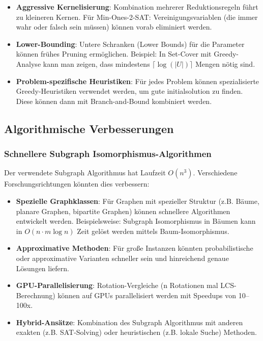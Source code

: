 ﻿\documentclass[a4paper,12pt]{article}
\theoremstyle{definition}
\begin{document}
\begin{itemize}
	\item \textbf{Aggressive Kernelisierung}: Kombination mehrerer Reduktionsregeln führt zu kleineren Kernen. Für Min-Ones-2-SAT: Vereinigungsvariablen (die immer wahr oder falsch sein müssen) können vorab eliminiert werden.
	
	\item \textbf{Lower-Bounding}: Untere Schranken (Lower Bounds) für die Parameter können frühes Pruning ermöglichen. Beispiel: In Set-Cover mit Greedy-Analyse kann man zeigen, dass mindestens $\lceil \log(|U|) \rceil$ Mengen nötig sind.
	
	\item \textbf{Problem-spezifische Heuristiken}: Für jedes Problem können spezialisierte Greedy-Heuristiken verwendet werden, um gute initialsolution zu finden. Diese können dann mit Branch-and-Bound kombiniert werden.
\end{itemize}

\subsection{Algorithmische Verbesserungen}

\subsubsection{Schnellere Subgraph Isomorphismus-Algorithmen}

Der verwendete Subgraph Algorithmus hat Laufzeit $O(n^3)$. Verschiedene Forschungsrichtungen könnten dies verbessern:

\begin{itemize}
	\item \textbf{Spezielle Graphklassen}: Für Graphen mit spezieller Struktur (z.B. Bäume, planare Graphen, bipartite Graphen) können schnellere Algorithmen entwickelt werden. Beispielsweise: Subgraph Isomorphismus in Bäumen kann in $O(n \cdot m \log n)$ Zeit gelöst werden mittels Baum-Isomorphismus.
	
	\item \textbf{Approximative Methoden}: Für große Instanzen könnten probabilistische oder approximative Varianten schneller sein und hinreichend genaue Lösungen liefern.
	
	\item \textbf{GPU-Parallelisierung}: Rotation-Vergleiche (n Rotationen mal LCS-Berechnung) können auf GPUs parallelisiert werden mit Speedups von 10--100x.
	
	\item \textbf{Hybrid-Ansätze}: Kombination des Subgraph Algorithmus mit anderen exakten (z.B. SAT-Solving) oder heuristischen (z.B. lokale Suche) Methoden.
\end{itemize}
\end{document}
